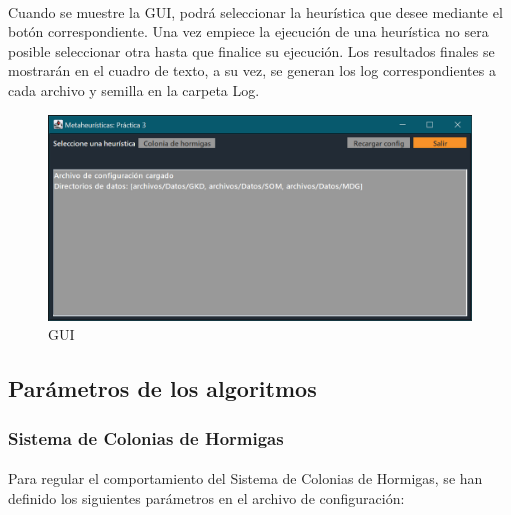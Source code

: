 		\paragraph{}Cuando se muestre la GUI, podrá seleccionar la heurística que desee mediante el botón correspondiente. Una vez empiece la ejecución de una heurística no sera posible seleccionar otra hasta que finalice su ejecución. Los resultados finales se mostrarán en el cuadro de texto, a su vez, se generan los log correspondientes a cada archivo y semilla en la carpeta Log.
	
		\begin{figure}[H]
		
			\centering
			\includegraphics[scale=0.4]{img/GUI}
			\caption{GUI}
		
		\end{figure}
	
		\newpage
	
	\subsection{Parámetros de los algoritmos}
	
		\subsubsection{Sistema de Colonias de Hormigas}

		\paragraph{}Para regular el comportamiento del Sistema de Colonias de Hormigas, se han definido los siguientes parámetros en el archivo de configuración:
		
